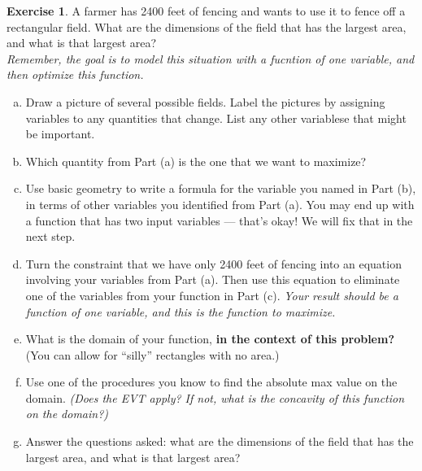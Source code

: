 \documentclass[11pt,reqno,final]{amsart}
\numberwithin{figure}{section}
\theoremstyle{definition} %
\newtheorem{exercise}[question]{Exercise}
\begin{document}
\begin{exercise}
        A farmer has 2400 feet of fencing and wants to use it to fence off a rectangular field. What are the dimensions of the field that has the largest area, and what is that largest area?\\
        \textit{Remember, the goal is to model this situation with a fucntion of one variable, and then optimize this function.}
        \begin{enumerate}[(a)]
        \item Draw a picture of several possible fields. Label the pictures by assigning variables to any quantities that change. List any other variablese that might be important.
                \vfill
                \vfill
                \vfill
        \item Which quantity from Part (a) is the one that we want to maximize?
                \vfill
        \item Use basic geometry to write a formula for the variable you named in Part (b), in terms of other variables you identified from Part (a).
                You may end up with a function that has two input variables --- that's okay! We will fix that in the next step.
                \vfill
                \vfill
                \newpage
        \item Turn the constraint that we have only 2400 feet of fencing into an equation involving your variables from Part (a).
                Then use this equation to eliminate one of the variables from your function in Part (c).
                \textit{Your result should be a function of one variable, and this is the function to maximize.}
                \vfill
                \vfill
        \item What is the domain of your function, \textbf{in the context of this problem?}
                (You can allow for ``silly'' rectangles with no area.)
                \vfill
        \item Use one of the procedures you know to find the absolute max value on the domain.
                \textit{(Does the EVT apply? If not, what is the concavity of this function on the domain?)}
                \vfill
                \vfill
        \item Answer the questions asked: what are the dimensions of the field that has the largest area, and what is that largest area?
                \vfill
        \end{enumerate}
\end{exercise}
\end{document}
